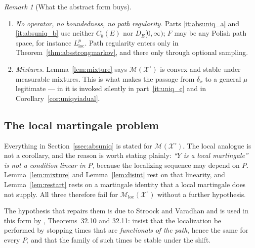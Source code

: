 \documentclass[11pt,a4paper]{article}
\theoremstyle{plain}
\theoremstyle{definition}
\theoremstyle{remark}
\newtheorem{remark}[theorem]{Remark}
\newcommand{\Cb}{C_b}                          %
\newcommand{\DE}{D_E[0,\infty)}
\newcommand{\XX}{\mathcal{X}}                  %
\newcommand{\Msol}{\mathcal{M}}
\newcommand{\EK}{\cite{EK86}}
\newcommand{\KA}{\cite{Kal21}}
\newcommand{\JS}{\cite{JS03}}
\begin{document}
\begin{remark}[What the abstract form buys]
\begin{enumerate}[label=(\roman*)]
    \emph{does} depend on $q$ and $g$ is whether the shifted problem is the
    \emph{same} problem: $\XX^\circ_r = \XX^\circ$ holds if and only if $q$ is
    shift invariant and $g$ is time independent, and only then is the Markov
    process homogeneous.  The first version of this manuscript required
    $\XX^\circ_r = \XX^\circ$ and therefore had to assume shift invariance of the
    clock; carrying the shifted family instead --- as \JS, III.2.39 do --- removes
    that hypothesis and yields the inhomogeneous case for free.  \EK{} never have
    to say any of this because their clock is Lebesgue measure and their $A$ does
    not depend on time.
  \item \emph{No operator, no boundedness, no path regularity.}  Parts
    \ref{it:absuniq_a} and \ref{it:absuniq_b} use neither $\Cb(E)$ nor $\DE$;
    $F$ may be any Polish path space, for instance $L^p_{\mathrm{loc}}$.  Path
    regularity enters only in Theorem~\ref{thm:absstrongmarkov}, and there only
    through optional sampling.
  \item \emph{Mixtures.}  Lemma~\ref{lem:mixture} says $\Msol(\XX^\circ)$ is
    convex and stable under measurable mixtures.  This is what makes the passage
    from $\delta_x$ to a general $\mu$ legitimate --- in \EK{} it is invoked
    silently in part~\ref{it:uniq_c} and in Corollary~\ref{cor:uniqviadual}.
  \end{enumerate}
\end{remark}

\subsection{The local martingale problem}
\label{ssec:localmp}

Everything in Section~\ref{ssec:absuniq} is stated for $\Msol(\XX^\circ)$.  The
local analogue is not a corollary, and the reason is worth stating plainly:
\emph{``$Y$ is a local martingale'' is not a condition linear in $P$}, because
the localizing sequence may depend on $P$.  Lemma~\ref{lem:mixture} and
Lemma~\ref{lem:disint} rest on that linearity, and Lemma~\ref{lem:restart} rests
on a martingale identity that a local martingale does not supply.  All three
therefore fail for $\Msol_{\mathrm{loc}}(\XX^\circ)$ without a further hypothesis.

The hypothesis that repairs them is due to Stroock and Varadhan and is used in
this form by \KA, Theorems~32.10 and 32.11: insist that the localization be
performed by stopping times that are \emph{functionals of the path}, hence the
same for every $P$, and that the family of such times be stable under the shift.
\end{document}
